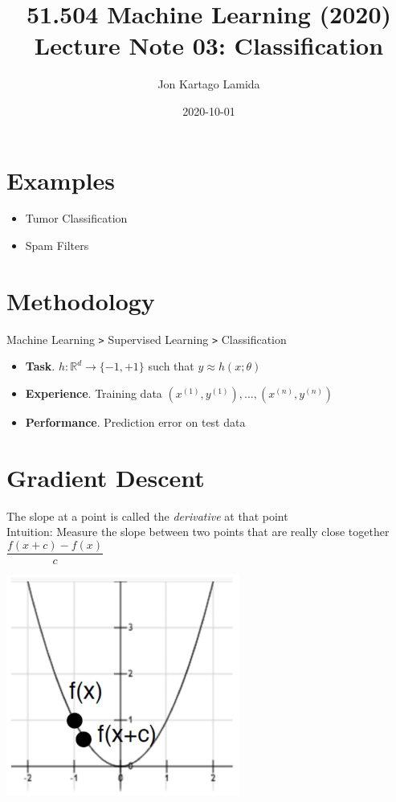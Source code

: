 \documentclass[12pt, a4paper]{article}
\title{%
51.504 Machine Learning (2020) \\
Lecture Note 03: Classification}
\date{2020-10-01}
\author{%
Jon Kartago Lamida}
\begin{document}
  \maketitle
  \setlength{\parindent}{0pt}

\section*{Examples}
\begin{itemize}
  \item Tumor Classification
  \item Spam Filters
\end{itemize}


\section*{Methodology}
Machine Learning \texttt{>} Supervised Learning \texttt{>} Classification
\begin{itemize}
  \item \textbf{Task}. \( h: \mathbb{R}^d \rightarrow \{-1, +1\} \) such that \( y \approx h(x; \theta)  \)
  \item \textbf{Experience}. Training data \( (x^{(1)}, y^{(1)}), \dots, (x^{(n)}, y^{(n)})  \)
  \item \textbf{Performance}. Prediction error on test data
\end{itemize}

\section*{Gradient Descent}
The slope at a  point is called the \emph{derivative} at that point \\

Intuition: Measure the slope between two points that are really close together \\

\( \dfrac{f(x + c) - f(x)}{c} \)

\includegraphics[scale=0.5]{gradient-descend}
\end{document}
